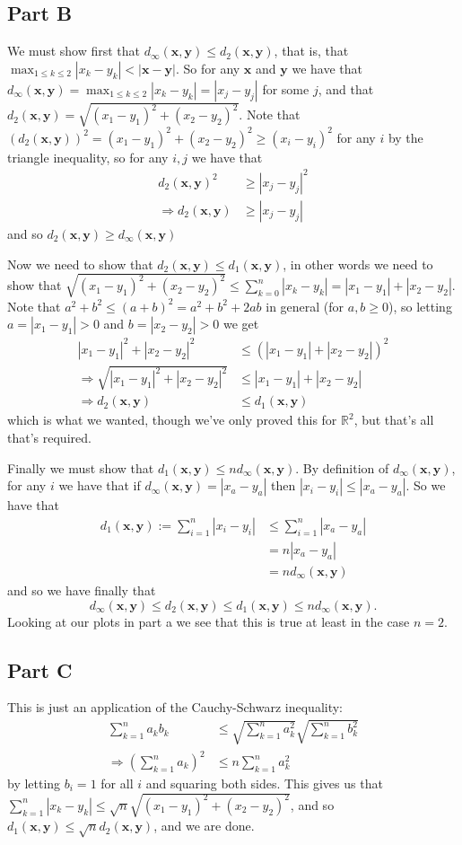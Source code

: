 \documentclass{article}
\def \R {\mathbb{R}}
\def \x {\textbf{x}}
\def \y {\textbf{y}}
\begin{document}
\subsection*{Part B}
We must show first that $d_\infty(\x,\y)\leq d_2(\x,\y)$, that is, that $\max_{1\leq k \leq 2}|x_k-y_k| < |\x-\y|$. So for any $\x$ and $\y$ we have that $d_\infty(\x,\y) = \max_{1\leq k \leq 2}|x_k-y_k| = |x_j-y_j|$ for some $j$, and that $d_2(\x,\y) = \sqrt{(x_1-y_1)^2+(x_2-y_2)^2}$. Note that $(d_2(\x,\y))^2 = (x_1-y_1)^2+(x_2-y_2)^2 \geq (x_i-y_i)^2$ for any $i$ by the triangle inequality, so for any $i,j$ we have that
	\begin{align*}
		d_2(\x,\y)^2 &\geq |x_j-y_j|^2 \\
		\Rightarrow
		d_2(\x,\y)   &\geq |x_j-y_j|
	\end{align*}
and so $d_2(\x,\y)\geq d_\infty(\x,\y)$

Now we need to show that $d_2(\x,\y)\leq d_1(\x,\y)$, in other words we need to show that $\sqrt{(x_1-y_1)^2+(x_2-y_2)^2} \leq \sum_{k=0}^n |x_k-y_k| = |x_1-y_1| + |x_2-y_2|$. Note that $a^2+b^2 \leq (a+b)^2=a^2+b^2+2ab$ in general (for $a,b\geq0$), so letting $a=|x_1-y_1|>0$ and $b=|x_2-y_2|>0$ we get
	\begin{align*}
		|x_1-y_1|^2+|x_2-y_2|^2 &\leq (|x_1-y_1|+|x_2-y_2|)^2 \\
		\Rightarrow
		\sqrt{|x_1-y_1|^2+|x_2-y_2|^2} &\leq |x_1-y_1|+|x_2-y_2|\\
		\Rightarrow
		d_2(\x,\y) &\leq d_1(\x,\y)
	\end{align*}
which is what we wanted, though we've only proved this for $\R^2$, but that's all that's required.

Finally we must show that $d_1(\x,\y)\leq nd_\infty(\x,\y)$. By definition of $d_\infty(\x,\y)$, for any $i$ we have that if $d_\infty(\x,\y)=|x_a-y_a|$ then $|x_i-y_i|\leq|x_a-y_a|$. So we have that 
	\begin{align*}
		d_1(\x,\y):=\sum_{i=1}^n |x_i-y_i| &\leq \sum_{i=1}^n |x_a-y_a| \\
		&= n|x_a-y_a| \\
		&= nd_\infty(\x,\y)
	\end{align*}
and so we have finally that
	\[
		d_\infty(\x,\y) \leq d_2 (\x,\y)\leq d_1 (\x,\y)\leq nd_\infty(\x,\y).
	\]
Looking at our plots in part a we see that this is true at least in the case $n=2$.

\subsection*{Part C}
This is just an application of the Cauchy-Schwarz inequality:
	\begin{align*}
		\sum_{k=1}^n a_kb_k &\leq \sqrt{\sum_{k=1}^na_k^2}\sqrt{\sum_{k=1}^nb_k^2} \\
		\Rightarrow \left(\sum_{k=1}^na_k\right)^2 &\leq n\sum_{k=1}^na_k^2
	\end{align*}
by letting $b_i=1$ for all $i$ and squaring both sides. This gives us that $\sum_{k=1}^n|x_k-y_k| \leq \sqrt{n}\sqrt{(x_1-y_1)^2 + (x_2-y_2)^2}$, and so $d_1(\x,\y) \leq \sqrt{n} d_2(\x,\y)$, and we are done.
\end{document}
